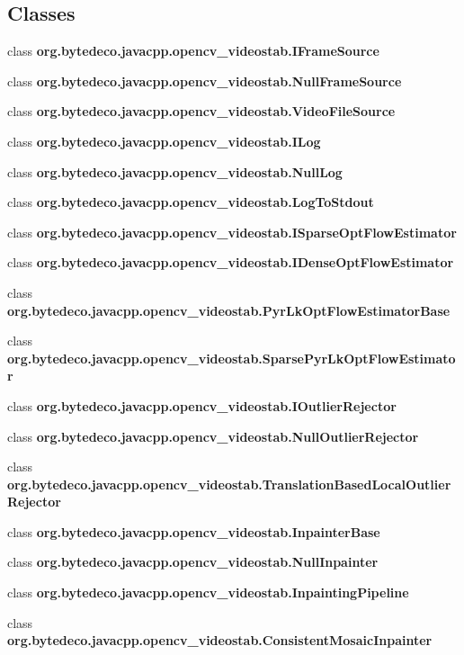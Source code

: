 \subsection*{Classes}
\begin{DoxyCompactItemize}
\item 
class {\bfseries org.\+bytedeco.\+javacpp.\+opencv\+\_\+videostab.\+I\+Frame\+Source}
\item 
class {\bfseries org.\+bytedeco.\+javacpp.\+opencv\+\_\+videostab.\+Null\+Frame\+Source}
\item 
class {\bfseries org.\+bytedeco.\+javacpp.\+opencv\+\_\+videostab.\+Video\+File\+Source}
\item 
class {\bfseries org.\+bytedeco.\+javacpp.\+opencv\+\_\+videostab.\+I\+Log}
\item 
class {\bfseries org.\+bytedeco.\+javacpp.\+opencv\+\_\+videostab.\+Null\+Log}
\item 
class {\bfseries org.\+bytedeco.\+javacpp.\+opencv\+\_\+videostab.\+Log\+To\+Stdout}
\item 
class {\bfseries org.\+bytedeco.\+javacpp.\+opencv\+\_\+videostab.\+I\+Sparse\+Opt\+Flow\+Estimator}
\item 
class {\bfseries org.\+bytedeco.\+javacpp.\+opencv\+\_\+videostab.\+I\+Dense\+Opt\+Flow\+Estimator}
\item 
class {\bfseries org.\+bytedeco.\+javacpp.\+opencv\+\_\+videostab.\+Pyr\+Lk\+Opt\+Flow\+Estimator\+Base}
\item 
class {\bfseries org.\+bytedeco.\+javacpp.\+opencv\+\_\+videostab.\+Sparse\+Pyr\+Lk\+Opt\+Flow\+Estimator}
\item 
class {\bfseries org.\+bytedeco.\+javacpp.\+opencv\+\_\+videostab.\+I\+Outlier\+Rejector}
\item 
class {\bfseries org.\+bytedeco.\+javacpp.\+opencv\+\_\+videostab.\+Null\+Outlier\+Rejector}
\item 
class {\bfseries org.\+bytedeco.\+javacpp.\+opencv\+\_\+videostab.\+Translation\+Based\+Local\+Outlier\+Rejector}
\item 
class {\bfseries org.\+bytedeco.\+javacpp.\+opencv\+\_\+videostab.\+Inpainter\+Base}
\item 
class {\bfseries org.\+bytedeco.\+javacpp.\+opencv\+\_\+videostab.\+Null\+Inpainter}
\item 
class {\bfseries org.\+bytedeco.\+javacpp.\+opencv\+\_\+videostab.\+Inpainting\+Pipeline}
\item 
class {\bfseries org.\+bytedeco.\+javacpp.\+opencv\+\_\+videostab.\+Consistent\+Mosaic\+Inpainter}

\end{DoxyCompactItemize}
